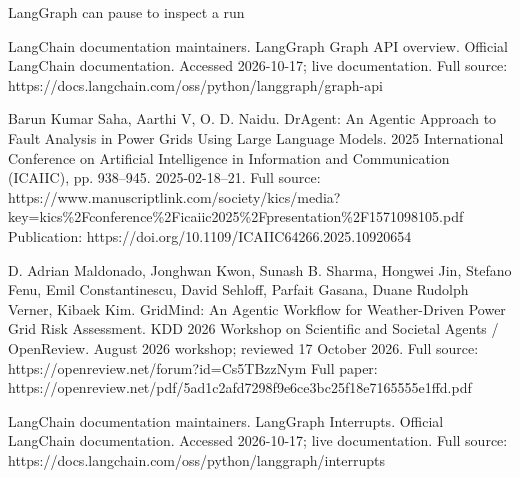 \begin{frame}[t]{LangGraph can pause to inspect a run}
{LangChain documentation maintainers. LangGraph Graph API overview. Official LangChain documentation. Accessed 2026-10-17; live documentation.
Full source: https://docs.langchain.com/oss/python/langgraph/graph-api

Barun Kumar Saha, Aarthi V, O. D. Naidu. DrAgent: An Agentic Approach to Fault Analysis in Power Grids Using Large Language Models. 2025 International Conference on Artificial Intelligence in Information and Communication (ICAIIC), pp. 938--945. 2025-02-18--21.
Full source: https://www.manuscriptlink.com/society/kics/media?key=kics\%2Fconference\%2Ficaiic2025\%2Fpresentation\%2F1571098105.pdf
Publication: https://doi.org/10.1109/ICAIIC64266.2025.10920654

D. Adrian Maldonado, Jonghwan Kwon, Sunash B. Sharma, Hongwei Jin, Stefano Fenu, Emil Constantinescu, David Sehloff, Parfait Gasana, Duane Rudolph Verner, Kibaek Kim. GridMind: An Agentic Workflow for Weather-Driven Power Grid Risk Assessment. KDD 2026 Workshop on Scientific and Societal Agents / OpenReview. August 2026 workshop; reviewed 17 October 2026.
Full source: https://openreview.net/forum?id=Cs5TBzzNym
Full paper: https://openreview.net/pdf/5ad1c2afd7298f9e6ce3bc25f18e7165555e1ffd.pdf

LangChain documentation maintainers. LangGraph Interrupts. Official LangChain documentation. Accessed 2026-10-17; live documentation.
Full source: https://docs.langchain.com/oss/python/langgraph/interrupts}
\end{frame}

